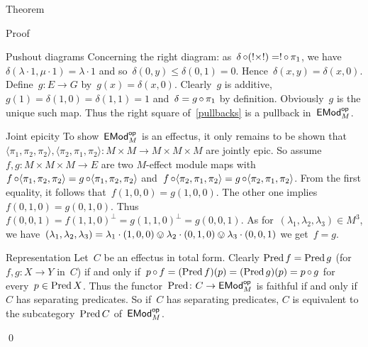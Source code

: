 \documentclass[b]{subfiles}
\begin{document}
\begin{parsec}
\begin{point}{Theorem}
\begin{point}{Proof}
\begin{point}{Pushout diagrams}
Concerning the right diagram:
    as~$\delta \mathop{\circ} (!\times!) = ! \mathop{\circ} \pi_1$,
    we have~$\delta(\lambda \cdot 1, \mu \cdot 1) = \lambda \cdot 1$
    and so~$\delta(0, y) \leq \delta(0,1) = 0$.
    Hence~$\delta(x,y) = \delta(x,0)$.
Define~$g\colon E \to G$ by~$g(x) = \delta(x,0)$.
Clearly~$g$ is additive, $g(1) = \delta(1,0) = \delta(1,1) = 1$
    and~$\delta = g \mathop{\circ} \pi_1$ by definition.
Obviously~$g$ is the unique such map.
Thus the right square of~\eqref{pullbacks}
    is a pullback in~$\mathsf{EMod}_M^{\mathsf{op}}$.
\end{point}
\begin{point}{Joint epicity}%
To show~$\mathsf{EMod}^{\mathsf{op}}_M$ is an effectus,
    it only remains to be shown
    that~$
    \langle \pi_1, \pi_2, \pi_2\rangle,
    \langle \pi_2, \pi_1, \pi_2\rangle\colon M \times M \to M \times M \times M
    $ are jointly epic.
So assume~$f,g\colon M \times M \times M \to E$
    are two $M$-effect module maps
    with~$
        f \mathop{\circ} \langle \pi_1,\pi_2,\pi_2\rangle =
        g \mathop{\circ} \langle \pi_1,\pi_2,\pi_2\rangle$
        and~$
        f \mathop{\circ} \langle \pi_2,\pi_1,\pi_2\rangle =
        g \mathop{\circ} \langle \pi_2,\pi_1,\pi_2\rangle$.
From the first equality, it follows that~$f(1,0,0) = g(1,0,0)$.
The other one implies~$f(0,1,0) = g(0,1,0)$.
Thus~$f(0,0,1) = f(1,1,0)^\perp = g(1,1,0)^\perp = g(0,0,1)$.
As for~$(\lambda_1,\lambda_2,\lambda_3) \in M^3$,
we have~$(\lambda_1,\lambda_2,\lambda_3)
            = \lambda_1 \cdot(1,0,0)
                \ovee \lambda_2\cdot (0,1,0)
                \ovee \lambda_3\cdot (0,0,1)$
    we get~$f=g$.
\end{point}
\begin{point}{Representation}%
Let~$C$ be an effectus in total form.
Clearly $\operatorname{Pred} f = \operatorname{Pred} g $ (for~$f,g\colon X \to Y$ in~$C$)
if and only if~$p \mathop{\circ} f = (\operatorname{Pred} f)(p)= (\operatorname{Pred} g)(p) = p \mathop{\circ} g$
for every~$p \in \operatorname{Pred} X$.
Thus the functor~$\operatorname{Pred}\colon C \to \mathsf{EMod}^{\mathsf{op}}_M$
    is faithful if and only if~$C$ has separating predicates.
So if~$C$ has separating predicates,
    $C$ is equivalent to the subcategory~$\operatorname{Pred} C$
    of~$\mathsf{EMod}_M^{\mathsf{op}}$.
\end{point}
    \qed
\end{point}
\end{point}
\end{parsec}
\end{document}
